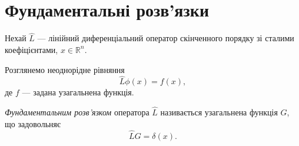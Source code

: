 %
%
%
%
%
%
%


\section{Фундаментальні розв'язки}

Нехай $\hat{L}$ --- лінійний диференціальний оператор скінченного порядку зі сталими коефіцієнтами, $x \in \mathbb{R}^n$.

Розглянемо неоднорідне рівняння
\begin{equation}\label{eq:inhomogeneous}
    \hat{L} \phi(x) = f(x),
\end{equation}
де $f$ --- задана узагальнена функція.

\emph{Фундаментальним розв'язком} оператора $\hat{L}$ називається узагальнена функція $G$, що задовольняє
\begin{equation}\label{eq:fundamental_solution}
    \hat{L} G = \delta(x).
\end{equation}


